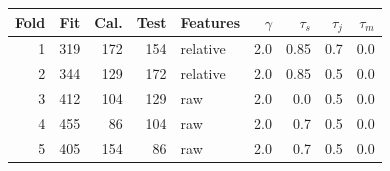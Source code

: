 \begin{tabular*}{\linewidth}{@{\extracolsep{\fill}}rrrrlrrrr@{}}
\toprule
Fold & Fit & Cal. & Test & Features & $\gamma$ & $\tau_s$ & $\tau_j$ & $\tau_m$ \\
\midrule
1 & 319 & 172 & 154 & relative & 2.0 & 0.85 & 0.7 & 0.0 \\
2 & 344 & 129 & 172 & relative & 2.0 & 0.85 & 0.5 & 0.0 \\
3 & 412 & 104 & 129 & raw & 2.0 & 0.0 & 0.5 & 0.0 \\
4 & 455 & 86 & 104 & raw & 2.0 & 0.7 & 0.5 & 0.0 \\
5 & 405 & 154 & 86 & raw & 2.0 & 0.7 & 0.5 & 0.0 \\
\bottomrule
\end{tabular*}
